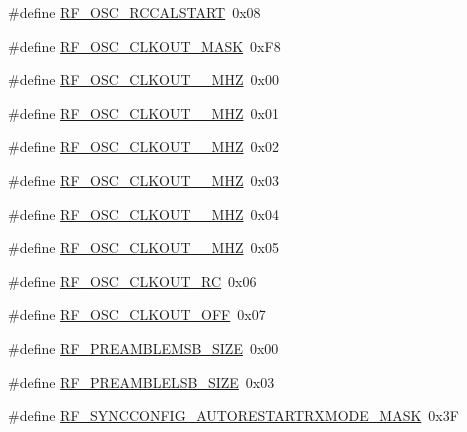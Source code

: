 \begin{DoxyCompactItemize}
\item 
\#define \mbox{\hyperlink{sx1276_regs-_fsk_8h_aa7d737cc3597f1868d03ae2da0d2ef1e}{R\+F\+\_\+\+O\+S\+C\+\_\+\+R\+C\+C\+A\+L\+S\+T\+A\+RT}}~0x08
\item 
\#define \mbox{\hyperlink{sx1276_regs-_fsk_8h_ac744b47205236aa1bab6db5de6d763cb}{R\+F\+\_\+\+O\+S\+C\+\_\+\+C\+L\+K\+O\+U\+T\+\_\+\+M\+A\+SK}}~0x\+F8
\item 
\#define \mbox{\hyperlink{sx1276_regs-_fsk_8h_a39939037ef778589c2a012a432af4001}{R\+F\+\_\+\+O\+S\+C\+\_\+\+C\+L\+K\+O\+U\+T\+\_\+\_\+\+M\+HZ}}~0x00
\item 
\#define \mbox{\hyperlink{sx1276_regs-_fsk_8h_a35cb9b93f3c11029ba94d749886a74b0}{R\+F\+\_\+\+O\+S\+C\+\_\+\+C\+L\+K\+O\+U\+T\+\_\+\_\+\+M\+HZ}}~0x01
\item 
\#define \mbox{\hyperlink{sx1276_regs-_fsk_8h_af99ef1d509dbd26671e0643217f15d02}{R\+F\+\_\+\+O\+S\+C\+\_\+\+C\+L\+K\+O\+U\+T\+\_\+\_\+\+M\+HZ}}~0x02
\item 
\#define \mbox{\hyperlink{sx1276_regs-_fsk_8h_aa7a24066783679941d44574aff9f7f2b}{R\+F\+\_\+\+O\+S\+C\+\_\+\+C\+L\+K\+O\+U\+T\+\_\+\_\+\+M\+HZ}}~0x03
\item 
\#define \mbox{\hyperlink{sx1276_regs-_fsk_8h_a6971552c1ee1dea0c304a1ce1698b7f7}{R\+F\+\_\+\+O\+S\+C\+\_\+\+C\+L\+K\+O\+U\+T\+\_\+\_\+\+M\+HZ}}~0x04
\item 
\#define \mbox{\hyperlink{sx1276_regs-_fsk_8h_a1ca04775f201904ebc725b7d3e642c7b}{R\+F\+\_\+\+O\+S\+C\+\_\+\+C\+L\+K\+O\+U\+T\+\_\+\_\+\+M\+HZ}}~0x05
\item 
\#define \mbox{\hyperlink{sx1276_regs-_fsk_8h_a69fef930e480b9c06fcb24746b6531cf}{R\+F\+\_\+\+O\+S\+C\+\_\+\+C\+L\+K\+O\+U\+T\+\_\+\+RC}}~0x06
\item 
\#define \mbox{\hyperlink{sx1276_regs-_fsk_8h_a5bef2e0155da1ee7ba0486ddd82b36cc}{R\+F\+\_\+\+O\+S\+C\+\_\+\+C\+L\+K\+O\+U\+T\+\_\+\+O\+FF}}~0x07
\item 
\#define \mbox{\hyperlink{sx1276_regs-_fsk_8h_a350e72bb75827ba417c04247092659f2}{R\+F\+\_\+\+P\+R\+E\+A\+M\+B\+L\+E\+M\+S\+B\+\_\+\+S\+I\+ZE}}~0x00
\item 
\#define \mbox{\hyperlink{sx1276_regs-_fsk_8h_aad343150a42f37198320692e62456844}{R\+F\+\_\+\+P\+R\+E\+A\+M\+B\+L\+E\+L\+S\+B\+\_\+\+S\+I\+ZE}}~0x03
\item 
\#define \mbox{\hyperlink{sx1276_regs-_fsk_8h_a74e4ab5de0446cd3ca9dce0ddad065e3}{R\+F\+\_\+\+S\+Y\+N\+C\+C\+O\+N\+F\+I\+G\+\_\+\+A\+U\+T\+O\+R\+E\+S\+T\+A\+R\+T\+R\+X\+M\+O\+D\+E\+\_\+\+M\+A\+SK}}~0x3F

\end{DoxyCompactItemize}
